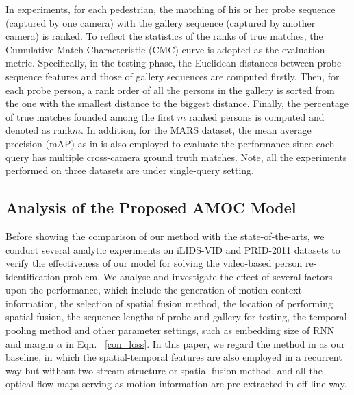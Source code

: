 \documentclass[journal]{IEEEtran}
\begin{document}
 In experiments, for each pedestrian, the matching of his or her probe sequence (captured by one camera) with the gallery sequence (captured by another camera) is ranked. To reflect the statistics of the ranks of true matches, the Cumulative Match Characteristic (CMC) curve is adopted as the evaluation metric.  Specifically, in the testing phase, the Euclidean distances between probe sequence features and those of gallery sequences are computed firstly. Then, for each probe person, a rank order of all the persons in the gallery is sorted from the one with the smallest distance to the biggest distance. Finally, the percentage of true matches founded among the first $m$ ranked persons is computed and denoted as rank$m$. In addition, for the MARS dataset, the mean average precision (mAP) as in \cite{zheng2016mars} is also employed to evaluate the performance since each query has multiple cross-camera ground truth matches. Note, all the experiments performed on three datasets are under single-query setting. 
 
 
\subsection{Analysis of the Proposed AMOC Model}\label{ana}
 
Before showing the comparison of our method with the state-of-the-arts, we conduct several analytic experiments on iLIDS-VID and PRID-2011 datasets to verify the effectiveness of our model for solving the video-based person re-identification problem. We analyse  and investigate the effect of several factors upon the performance, which include the  generation of motion context information, the selection of spatial fusion method, the location of performing spatial fusion, the sequence lengths of probe and gallery for testing, the temporal pooling method and other parameter settings, such as embedding size of RNN and margin $\alpha$ in Eqn. ~\eqref{con_loss}. In this paper, we regard the method in \cite{mclaughlinrecurrent} as our baseline, in which  the spatial-temporal features are also employed in a recurrent way but without two-stream structure or spatial fusion method, and all the optical flow maps serving as motion information are pre-extracted in off-line way. 
\end{document}
